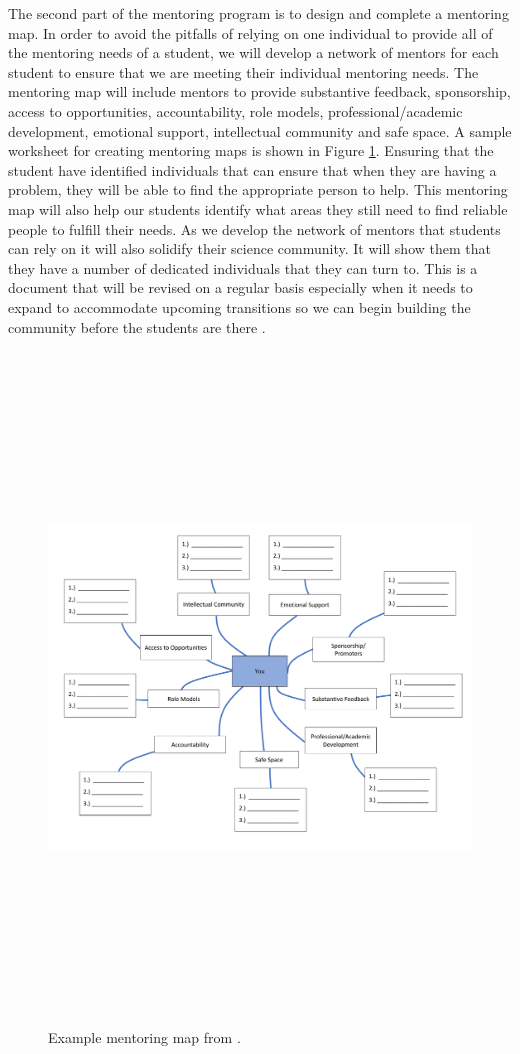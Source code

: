 \documentclass[12pt]{article}
\begin{document}
The second part of the mentoring program is to design and complete a mentoring map. In order to avoid the pitfalls of relying on one individual to provide all of the mentoring needs of a student, we will develop a network of mentors for each student to ensure that we are meeting their individual mentoring needs.  The mentoring map will include mentors to provide substantive feedback, sponsorship, access to opportunities, accountability, role models, professional/academic development, emotional support, intellectual community and safe space. A sample worksheet for creating mentoring maps is shown in Figure \ref{fig:map}.  Ensuring that the student have identified individuals that can ensure that when they are having a problem, they will be able to find the appropriate person to help. This mentoring map will also help our students identify what areas they still need to find reliable people to fulfill their needs.  As we develop the network of mentors that students can rely on it will also solidify their science community. It will show them that they have a number of dedicated individuals that they can turn to.  This is a document that will be revised on a regular basis especially when it needs to expand to accommodate upcoming transitions so we can begin building the community before the students are there \citep{NAP25568}. 

\begin{figure}
    \centering
    \includegraphics[height=7in]{mentoringmap.pdf}
    \caption{Example mentoring map from \citet{Bosch}.
    \label{fig:map}}
\end{figure}
\end{document}

